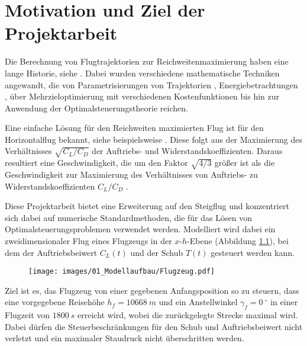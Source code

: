 \chapter{Motivation und Ziel der Projektarbeit}
Die Berechnung von Flugtrajektorien zur Reichweitenmaximierung haben eine lange Historie, siehe \cite{Burrows1982, Murrieta2016, Schaback2017, Pierson1989}.  Dabei wurden verschiedene mathematische Techniken angewandt, die von Parametrisierungen von Trajektorien \cite{Burrows1982}, Energiebetrachtungen \cite{Calise1977}, über Mehrzieloptimierung mit verschiedenen Kostenfunktionen \cite{Gardi2016} bis hin zur Anwendung der Optimalsteuerungstheorie \cite{Javier2016}  reichen. 

Eine einfache Lösung für den Reichweiten maximierten Flug ist für den Horizontalflug bekannt, siehe beispielsweise \cite{Peckham1974}. Diese folgt aus der Maximierung des Verhältnisses $\sqrt{C_{L}/C_{D}}$ der Auftriebs- und Widerstandskoeffizienten. Daraus resultiert eine Geschwindigkeit, die um den Faktor $\sqrt{4/3}$ größer ist als die Geschwindigkeit zur Maximierung des Verhältnisses von Auftriebs- zu Widerstandskoeffizienten $C_{L}/C_{D}$ \cite{Schaback2017}. 

Diese Projektarbeit bietet eine Erweiterung auf den Steigflug und konzentriert sich dabei auf numerische Standardmethoden, die für das Lösen von Optimalsteuerungsproblemen verwendet werden. Modelliert wird dabei ein zweidimensionaler Flug eines Flugzeugs in der $x$-$h$-Ebene (Abbildung \ref{img:Flugzeug}), bei dem der Auftriebsbeiwert $C_L(t)$ und der Schub $T(t)$ gesteuert werden kann.

\begin{figure}[H]
    \begin{center}
        \texttt{[image: images/01\_Modellaufbau/Flugzeug.pdf]}
        \label{img:Flugzeug}
    \end{center}
\end{figure}

Ziel ist es, das Flugzeug von einer gegebenen Anfangsposition so zu steuern, dass eine vorgegebene Reisehöhe $h_f = 10668\ m$ und ein Anstellwinkel $\gamma_f = 0\ ^{\circ}$ in einer Flugzeit von $1800 \ s$ erreicht  wird, wobei die zurückgelegte Strecke maximal wird. Dabei dürfen die Steuerbeschränkungen für den Schub und Auftriebsbeiwert nicht verletzt und ein maximaler Staudruck nicht überschritten werden. 

